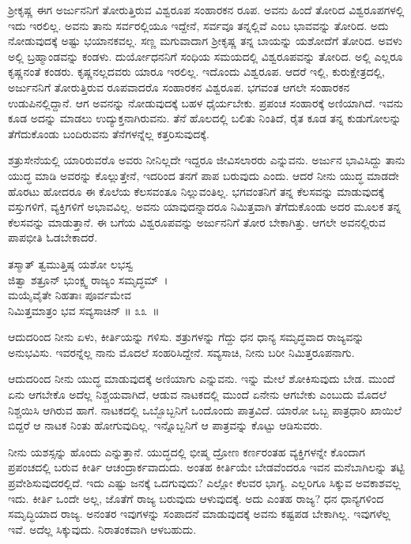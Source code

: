 ಶ‍್ರೀಕೃಷ್ಣ ಈಗ ಅರ್ಜುನನಿಗೆ ತೋರುತ್ತಿರುವ ವಿಶ್ವರೂಪ ಸಂಹಾರಕನ ರೂಪ. ಅವನು ಹಿಂದೆ ತೋರಿದ ವಿಶ್ವರೂಪಗಳಲ್ಲಿ ಇದು ಇರಲಿಲ್ಲ. ಅವನು ತಾನು ಸರ್ವರಲ್ಲಿಯೂ ಇದ್ದೇನೆ, ಸರ್ವವೂ ತನ್ನಲ್ಲಿವೆ ಎಂಬ ಭಾವವನ್ನು ತೋರಿದ. ಅದು ನೋಡುವುದಕ್ಕೆ ಅಷ್ಟು ಭಯಾನಕವಲ್ಲ. ಸಣ್ಣ ಮಗುವಾದಾಗ ಶ‍್ರೀಕೃಷ್ಣ ತನ್ನ ಬಾಯನ್ನು ಯಶೋದೆಗೆ ತೋರಿದ. ಅವಳು ಅಲ್ಲಿ ಬ್ರಹ್ಮಾಂಡವನ್ನು ಕಂಡಳು. ದುರ್ಯೋಧನನಿಗೆ ಸಂಧಿಯ ಸಮಯದಲ್ಲಿ ವಿಶ್ವರೂಪವನ್ನು ತೋರಿದ. ಅಲ್ಲಿ ಎಲ್ಲರೂ ಕೃಷ್ಣನಂತೆ ಕಂಡರು. ಕೃಷ್ಣನಲ್ಲದವರು ಯಾರೂ ಇರಲಿಲ್ಲ. ಇದೊಂದು ವಿಶ್ವರೂಪ. ಆದರೆ ಇಲ್ಲಿ, ಕುರುಕ್ಷೇತ್ರದಲ್ಲಿ, ಅರ್ಜುನನಿಗೆ ತೋರುತ್ತಿರುವ ರೂಪವಾದರೊ ಸಂಹಾರಕನ ವಿಶ್ವರೂಪ. ಭಗವಂತ ಆಗಲೇ ಸಂಹಾರಕನ ಉಡುಪಿನಲ್ಲಿದ್ದಾನೆ. ಆಗ ಅವನನ್ನು ನೋಡುವುದಕ್ಕೆ ಬಹಳ ಧೈರ್ಯಬೇಕು. ಪ್ರಪಂಚ ಸಂಹಾರಕ್ಕೆ ಅಣಿಯಾಗಿದೆ. ಇವನು ಕೂಡ ಅದನ್ನು ಮಾಡಲು ಉದ್ಯುಕ್ತನಾಗಿರುವನು. ತೆನೆ ಹೊಲದಲ್ಲಿ ಬಲಿತು ನಿಂತಿದೆ, ರೈತ ಕೂಡ ತನ್ನ ಕುಡುಗೋಲನ್ನು ತೆಗೆದುಕೊಂಡು ಬಂದಿರುವನು ತೆನೆಗಳನ್ನೆಲ್ಲ ಕತ್ತರಿಸುವುದಕ್ಕೆ.

ಶತ್ರುಸೇನೆಯಲ್ಲಿ ಯಾರಿರುವರೊ ಅವರು ನೀನಿಲ್ಲದೇ ಇದ್ದರೂ ಜೀವಿಸಲಾರರು ಎನ್ನುವನು. ಅರ್ಜುನ ಭಾವಿಸಿದ್ದು ತಾನು ಯುದ್ಧ ಮಾಡಿ ಅವರನ್ನು ಕೊಲ್ಲುತ್ತೇನೆ, ಇದರಿಂದ ತನಗೆ ಪಾಪ ಬರುವುದು ಎಂದು. ಆದರೆ ನೀನು ಯುದ್ಧ ಮಾಡದೇ ಹೊರಟು ಹೋದರೂ ಈ ಕೊಲೆಯ ಕೆಲಸವಂತೂ ನಿಲ್ಲುವಂತಿಲ್ಲ. ಭಗವಂತನಿಗೆ ತನ್ನ ಕೆಲಸವನ್ನು ಮಾಡುವುದಕ್ಕೆ ವಸ್ತುಗಳಿಗೆ, ವ್ಯಕ್ತಿಗಳಿಗೆ ಅಭಾವವಿಲ್ಲ. ಅವನು ಯಾವುದನ್ನಾದರೂ ನಿಮಿತ್ತವಾಗಿ ತೆಗೆದುಕೊಂಡು ಅದರ ಮೂಲಕ ತನ್ನ ಕೆಲಸವನ್ನು ಮಾಡುತ್ತಾನೆ. ಈ ಬಗೆಯ ವಿಶ್ವರೂಪವನ್ನು ಅರ್ಜುನನಿಗೆ ತೋರ ಬೇಕಾಗಿತ್ತು. ಆಗಲೇ ಅವನಲ್ಲಿರುವ ಪಾಪಭೀತಿ ಓಡಬೇಕಾದರೆ.

\begin{shloka}
ತಸ್ಮಾತ್ ತ್ವಮುತ್ತಿಷ್ಠ ಯಶೋ ಲಭಸ್ವ\\ ಜಿತ್ವಾ ಶತ್ರೂನ್ ಭುಂಕ್ಷ್ವ ರಾಜ್ಯಂ ಸಮೃದ್ಧಮ್~।\\ಮಯೈವೈತೇ ನಿಹತಾಃ ಪೂರ್ವಮೇವ\\ ನಿಮಿತ್ತಮಾತ್ರಂ ಭವ ಸವ್ಯಸಾಚಿನ್ \hfill॥ ೩೩~॥
\end{shloka}

\begin{artha}
ಆದುದರಿಂದ ನೀನು ಏಳು, ಕೀರ್ತಿಯನ್ನು ಗಳಿಸು. ಶತ್ರುಗಳನ್ನು ಗೆದ್ದು ಧನ ಧಾನ್ಯ ಸಮೃದ್ಧವಾದ ರಾಜ್ಯವನ್ನು ಅನುಭವಿಸು. ಇವರನ್ನೆಲ್ಲ ನಾನು ಮೊದಲೆ ಸಂಹರಿಸಿದ್ದೇನೆ. ಸವ್ಯಸಾಚಿ, ನೀನು ಬರೀ ನಿಮಿತ್ತರೂಪನಾಗು.
\end{artha}

ಆದುದರಿಂದ ನೀನು ಯುದ್ಧ ಮಾಡುವುದಕ್ಕೆ ಅಣಿಯಾಗು ಎನ್ನುವನು. ಇನ್ನು ಮೇಲೆ ಶೋಕಿಸುವುದು ಬೇಡ. ಮುಂದೆ ಏನು ಆಗಬೇಕೊ ಅದೆಲ್ಲ ನಿಶ್ಚಯವಾಗಿದೆ, ಆಡುವ ನಾಟಕದಲ್ಲಿ ಮುಂದೆ ಏನೇನು ಆಗಬೇಕು ಎಂಬುದು ಮೊದಲೆ ನಿಶ್ಚಯಿಸಿ ಆಗಿರುವ ಹಾಗೆ. ನಾಟಕದಲ್ಲಿ ಒಬ್ಬೊಬ್ಬನಿಗೆ ಒಂದೊಂದು ಪಾತ್ರವಿದೆ. ಯಾರೋ ಒಬ್ಬ ಪಾತ್ರಧಾರಿ ಖಾಯಿಲೆ ಬಿದ್ದರೆ ಆ ನಾಟಕ ನಿಂತು ಹೋಗುವುದಿಲ್ಲ. ಇನ್ನೊಬ್ಬನಿಗೆ ಆ ಪಾತ್ರವನ್ನು ಕೊಟ್ಟು ಆಡಿಸುವರು.

ನೀನು ಯಶಸ್ಸನ್ನು ಹೊಂದು ಎನ್ನುತ್ತಾನೆ. ಯುದ್ಧದಲ್ಲಿ ಭೀಷ್ಮ ದ್ರೋಣ ಕರ್ಣರಂತಹ ವ್ಯಕ್ತಿಗಳನ್ನೇ ಕೊಂದಾಗ ಪ್ರಪಂಚದಲ್ಲಿ ಬರುವ ಕೀರ್ತಿ ಆಚಂದ್ರಾರ್ಕವಾದುದು. ಅಂತಹ ಕೀರ್ತಿಯೇ ಬೇಡವೆಂದರೂ ಇವನ ಮನೆಬಾಗಿಲನ್ನು ತಟ್ಟಿ ಪ್ರವೇಶಿಸುವುದರಲ್ಲಿದೆ. ಇದು ಎಷ್ಟು ಜನಕ್ಕೆ ಒದಗುವುದು? ಎಲ್ಲೋ ಕೆಲವರ ಭಾಗ್ಯ. ಎಲ್ಲರಿಗೂ ಸಿಕ್ಕುವ ಅವಕಾಶವಲ್ಲ ಇದು. ಕೀರ್ತಿ ಒಂದೇ ಅಲ್ಲ, ಜೊತೆಗೆ ರಾಜ್ಯ ಬರುವುದು ಆಳುವುದಕ್ಕೆ. ಅದು ಎಂತಹ ರಾಜ್ಯ? ಧನ ಧಾನ್ಯಗಳಿಂದ ಸಮೃದ್ಧಿಯಾದ ರಾಜ್ಯ. ಅನಂತರ ಇವುಗಳನ್ನು ಸಂಪಾದನೆ ಮಾಡುವುದಕ್ಕೆ ಅವನು ಕಷ್ಟಪಡ ಬೇಕಾಗಿಲ್ಲ. ಇವುಗಳೆಲ್ಲ ಇವೆ. ಅದೆಲ್ಲ ಸಿಕ್ಕುವುದು. ನಿರಾತಂಕವಾಗಿ ಆಳಬಹುದು.

